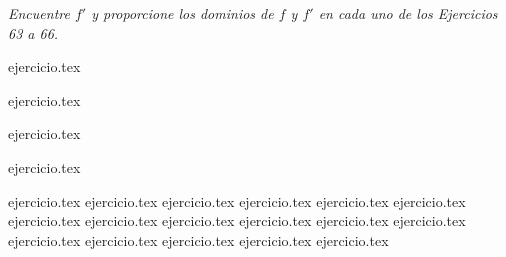 \noindent \textit{Encuentre $f'$ y proporcione los dominios de $f$ y $f'$ en cada uno de los Ejercicios 63 a 66.}

\begin{enumerate}
    \begin{minipage}{0.45\textwidth}
    \setcounter{enumi}{62}
    {ejercicio.tex}
    \addtocounter{enumi}{1}
    {ejercicio.tex}
    \end{minipage}%
    \begin{minipage}{0.45\textwidth}
    \setcounter{enumi}{63}
    {ejercicio.tex}
    \addtocounter{enumi}{1}
    {ejercicio.tex}
    \end{minipage}
\end{enumerate}

\begin{enumerate}
    \setcounter{enumi}{66}
    {ejercicio.tex}
    {ejercicio.tex}
    {ejercicio.tex}
    {ejercicio.tex}
    {ejercicio.tex}
    {ejercicio.tex}
    {ejercicio.tex}
    {ejercicio.tex}
    {ejercicio.tex}
    {ejercicio.tex}
    {ejercicio.tex}
    {ejercicio.tex}
    \setcounter{enumi}{78}
    {ejercicio.tex}
    {ejercicio.tex}
    {ejercicio.tex}
    {ejercicio.tex}
    {ejercicio.tex}
\end{enumerate}
